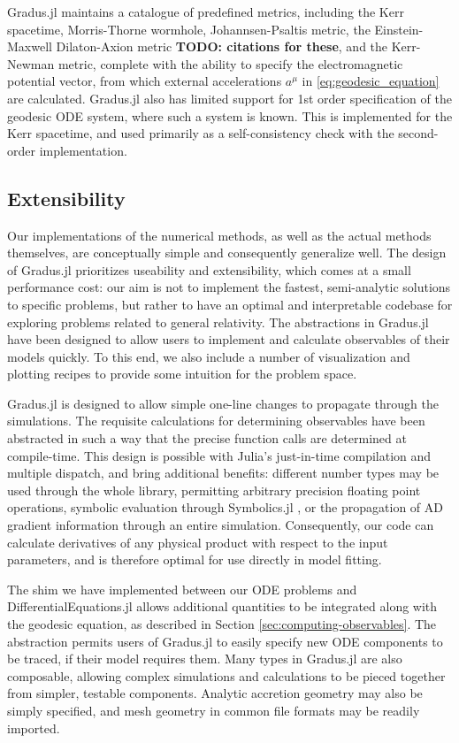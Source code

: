 \documentclass[fleqn,usenatbib]{mnras}
\newcommand{\todo}[1]{{\noindent \bf \color{red} TODO: #1}}
\newcommand{\Gradus}{Gradus.jl }
\begin{document}
\Gradus maintains a catalogue of predefined metrics, including the Kerr spacetime, Morris-Thorne wormhole, Johannsen-Psaltis metric, the Einstein-Maxwell Dilaton-Axion metric \todo{citations for these}, and the Kerr-Newman metric, complete with the ability to specify the electromagnetic potential vector, from which external accelerations $a^\mu$ in \eqref{eq:geodesic_equation} are calculated. \Gradus also has limited support for 1st order specification of the geodesic ODE system, where such a system is known. This is implemented for the Kerr spacetime, and used primarily as a self-consistency check with the second-order implementation.

\subsection{Extensibility}

Our implementations of the numerical methods, as well as the actual methods themselves, are conceptually simple and consequently generalize well. The design of \Gradus prioritizes useability and extensibility, which comes at a small performance cost: our aim is not to implement the fastest, semi-analytic solutions to specific problems, but rather to have an optimal and interpretable codebase for exploring problems related to general relativity. The abstractions in \Gradus have been designed to allow users to implement and calculate observables of their models quickly. To this end, we also include a number of visualization and plotting recipes to provide some intuition for the problem space.

\Gradus is designed to allow simple one-line changes to propagate through the simulations. The requisite calculations for determining observables have been abstracted in such a way that the precise function calls are determined at compile-time. This design is possible with Julia's just-in-time compilation and multiple dispatch, and bring additional benefits: different number types may be used through the whole library, permitting arbitrary precision floating point operations, symbolic evaluation through Symbolics.jl \citep{symbolics_julia}, or the propagation of AD gradient information through an entire simulation. Consequently, our code can calculate derivatives of any physical product with respect to the input parameters, and is therefore optimal for use directly in model fitting.

The shim we have implemented between our ODE problems and DifferentialEquations.jl allows additional quantities to be integrated along with the geodesic equation, as described in Section \ref{sec:computing-observables}. The abstraction permits users of \Gradus to easily specify new ODE components to be traced, if their model requires them. Many types in \Gradus are also composable, allowing complex simulations and calculations to be pieced together from simpler, testable components. Analytic accretion geometry may also be simply specified, and mesh geometry in common file formats may be readily imported.
\end{document}
